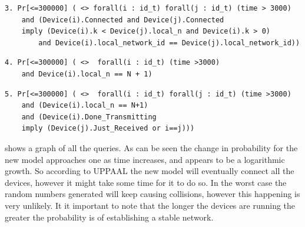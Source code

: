 \begin{lstlisting}[style=UPPAAL, title={This query asks after 3000 UPPAAL time units have passed, what then is the probability that if a device \texttt{i} and a device \texttt{j} are both connected that then \texttt{i}'s value of \texttt{k} will be larger than zero and smaller than any \texttt{n}, and that they are connected to the same network. This query ensures that all the \texttt{k}-values are within the wanted range after a network is made. UPPAAL runs this query and within 3451 runs [0.998,1] with confidence 99.9 \% this is true. This query had a run-time of 45 seconds.}]
3. Pr[<=300000] ( <> forall(i : id_t) forall(j : id_t) (time > 3000) 
    and (Device(i).Connected and Device(j).Connected 
    imply (Device(i).k < Device(j).local_n and Device(i).k > 0) 
        and Device(i).local_network_id == Device(j).local_network_id))

\end{lstlisting}

\begin{lstlisting}[style=UPPAAL, title={This query asks after 3000 UPPAAL time units have passed, what then is the probability that a device \texttt{i} has a local value of \texttt{n} to be equal to the number of devices plus the the empty slot, which is \texttt{N} + 1, which means that all devices are in the same network. UPPAAL runs this query and within 3451 runs [0.998,1] with confidence 99.9 \% this is true. This query has a run-time of 38 seconds.}]
4. Pr[<=300000] ( <>  forall(i : id_t) (time >3000) 
    and Device(i).local_n == N + 1)
\end{lstlisting}

\begin{lstlisting}[style=UPPAAL, title={This query is a generalisation of the previous which includes a check of whether when one device finish transmitting then the rest are just finished receiving. UPPAAL runs this query and within 3451 runs [0.998,1] with confidence 99.9 \% this is true. The run-time of this query is 131 seconds.}]
5. Pr[<=300000] ( <>  forall(i : id_t) forall(j : id_t) (time >3000) 
    and (Device(i).local_n == N+1) 
    and (Device(i).Done_Transmitting 
    imply (Device(j).Just_Received or i==j)))
\end{lstlisting}

\noindent
{} shows a graph of all the queries.
As can be seen the change in probability for the new model approaches one as time increases, and appears to be a logarithmic growth.
So according to UPPAAL the new model will eventually connect all the devices, however it might take some time for it to do so.
In the worst case the random numbers generated will keep causing collisions, however this happening is very unlikely. 
It it important to note that the longer the devices are running the greater the probability is of establishing a stable network.

